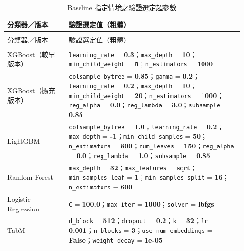 \begingroup
\footnotesize{}\setlength{\tabcolsep}{3pt}
\setlength{\LTleft}{\fill}\setlength{\LTright}{\fill}
\begin{longtable}{@{}>{\raggedright\arraybackslash}p{0.25\linewidth}>{\raggedright\arraybackslash}p{0.71\linewidth}@{}}
\caption{Baseline 指定情境之驗證選定超參數}\label{tab:validation-selected-parameters}\\
\toprule
分類器／版本 & 驗證選定值（粗體） \\
\midrule\endfirsthead
\multicolumn{2}{c}{表~\thetable（續）}\\
\toprule
分類器／版本 & 驗證選定值（粗體） \\
\midrule\endhead
\midrule\multicolumn{2}{r}{續下頁}\\\endfoot
\bottomrule\endlastfoot
XGBoost（較早版本） & \nolinkurl{learning_rate} = \textbf{0.3}；\nolinkurl{max_depth} = \textbf{10}；\nolinkurl{min_child_weight} = \textbf{5}；\nolinkurl{n_estimators} = \textbf{1000} \\
XGBoost（擴充版本） & \nolinkurl{colsample_bytree} = \textbf{0.85}；\nolinkurl{gamma} = \textbf{0.2}；\nolinkurl{learning_rate} = \textbf{0.2}；\nolinkurl{max_depth} = \textbf{10}；\nolinkurl{min_child_weight} = \textbf{20}；\nolinkurl{n_estimators} = \textbf{1000}；\nolinkurl{reg_alpha} = \textbf{0.0}；\nolinkurl{reg_lambda} = \textbf{3.0}；\nolinkurl{subsample} = \textbf{0.85} \\
LightGBM & \nolinkurl{colsample_bytree} = \textbf{1.0}；\nolinkurl{learning_rate} = \textbf{0.2}；\nolinkurl{max_depth} = \textbf{-1}；\nolinkurl{min_child_samples} = \textbf{50}；\nolinkurl{n_estimators} = \textbf{800}；\nolinkurl{num_leaves} = \textbf{150}；\nolinkurl{reg_alpha} = \textbf{0.0}；\nolinkurl{reg_lambda} = \textbf{1.0}；\nolinkurl{subsample} = \textbf{0.85} \\
Random Forest & \nolinkurl{max_depth} = \textbf{32}；\nolinkurl{max_features} = \textbf{sqrt}；\nolinkurl{min_samples_leaf} = \textbf{1}；\nolinkurl{min_samples_split} = \textbf{16}；\nolinkurl{n_estimators} = \textbf{600} \\
Logistic Regression & \nolinkurl{C} = \textbf{100.0}；\nolinkurl{max_iter} = \textbf{1000}；\nolinkurl{solver} = \textbf{lbfgs} \\
TabM & \nolinkurl{d_block} = \textbf{512}；\nolinkurl{dropout} = \textbf{0.2}；\nolinkurl{k} = \textbf{32}；\nolinkurl{lr} = \textbf{0.001}；\nolinkurl{n_blocks} = \textbf{3}；\nolinkurl{use_num_embeddings} = \textbf{False}；\nolinkurl{weight_decay} = \textbf{1e-05} \\
\end{longtable}
\endgroup
